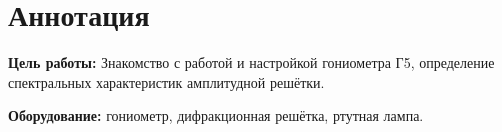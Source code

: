 \section{Аннотация}
\textbf{Цель работы:} Знакомство с работой и настройкой гониометра Г5, определение спектральных характеристик амплитудной решётки.

\textbf{Оборудование:} гониометр, дифракционная решётка, ртутная лампа.
